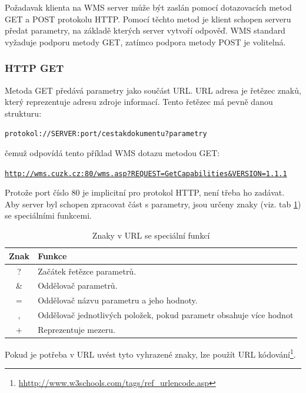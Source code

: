 \documentclass[a4paper,12pt]{article}
\begin{document}
Požadavak klienta na WMS server může být zaslán pomocí dotazovacích metod GET a POST protokolu HTTP. Pomocí těchto metod je klient schopen
serveru předat parametry, na základě kterých server vytvoří odpověď. WMS standard vyžaduje podporu metody GET, zatímco podpora metody POST je volitelná. 

\subsubsection{HTTP GET}

Metoda GET předává parametry jako součást URL. URL adresa  je řetězec znaků, který reprezentuje adresu zdroje informací. Tento řetězec má pevně danou strukturu:
	
\begin{alltt}\footnotesize
	protokol://SERVER: port / cesta k dokumentu ? parametry
\end{alltt}
	
čemuž odpovídá tento příklad WMS dotazu metodou GET:

\begin{alltt}\footnotesize
\url{http://wms.cuzk.cz:80/wms.asp?REQUEST=GetCapabilities&VERSION=1.1.1}
\end{alltt}

\newpage

Protože port číslo 80 je implicitní pro protokol HTTP, není třeba ho zadávat.   
Aby server byl schopen zpracovat část s parametry, jsou určeny znaky (viz. tab \ref{tab:myfirsttable}) se speciálními funkcemi. 

\begin{table}[h]
\centering
\begin{tabular}{|c|l|}      \hline
  Znak      &    Funkce				\\ \hline
   ?        &  Začátek řetězce parametrů.      	\\ \hline
   \&       &  Oddělovač parametrů.   		\\ \hline
   =        &  Oddělovač názvu parametru a jeho hodnoty.    \\ \hline
   ,        &  Oddělovač jednotlivých položek, pokud parametr obsahuje více hodnot\\ \hline
   +        &  Reprezentuje mezeru. 	\\ \hline
\end{tabular}
\caption{Znaky v URL se speciální funkcí}
\label{tab:myfirsttable}
\end{table}

Pokud je potřeba v URL uvést tyto vyhrazené znaky, lze použít URL kódování\footnote{\url{hhttp://www.w3schools.com/tags/ref_urlencode.asp}}.
\end{document}
